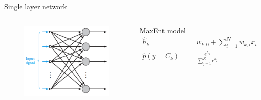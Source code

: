 \documentclass{beamer}
\begin{document}
\begin{frame}{Single layer network}

\begin{columns}[t]

\begin{figure}[h!]
  \centering
  \includegraphics[width=1\textwidth]{images/single_layer.png}
\end{figure}	


\begin{block}{MaxEnt model}
\begin{eqnarray*}
\hat{h}_k &=& w_{k, 0} + \sum_{i=1}^N w_{k, i} x_i \\
\hat{p}\left(y = C_k\right) &=& \frac{e^{h_k}}{\sum_{j=1}^K e^{h_j}}
\end{eqnarray*}
\end{block}
	
\end{columns}

\end{frame}
\end{document}
